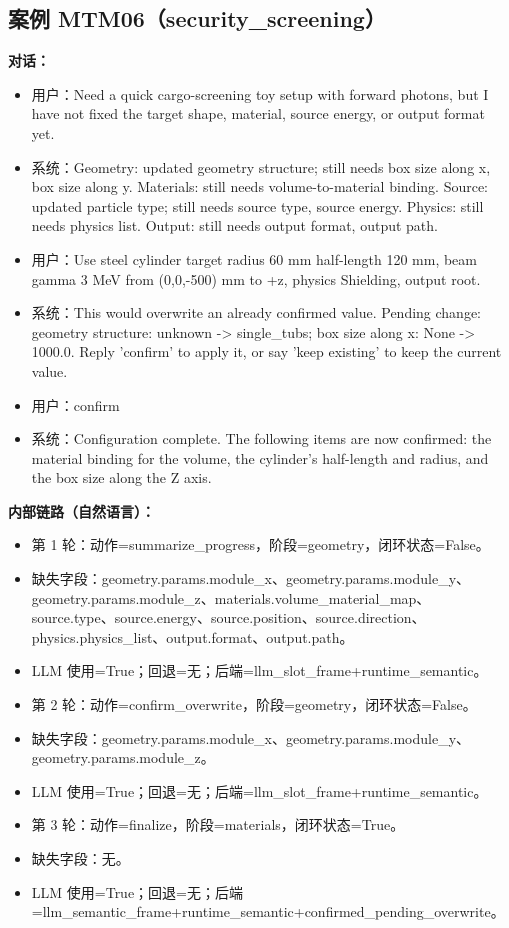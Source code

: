 \documentclass[11pt]{ctexart}
\begin{document}
\subsection{案例 MTM06（security\_screening）}
\textbf{对话：}
\begin{itemize}
\item 用户：Need a quick cargo-screening toy setup with forward photons, but I have not fixed the target shape, material, source energy, or output format yet.
\item 系统：Geometry: updated geometry structure; still needs box size along x, box size along y. Materials: still needs volume-to-material binding. Source: updated particle type; still needs source type, source energy. Physics: still needs physics list. Output: still needs output format, output path.
\item 用户：Use steel cylinder target radius 60 mm half-length 120 mm, beam gamma 3 MeV from (0,0,-500) mm to +z, physics Shielding, output root.
\item 系统：This would overwrite an already confirmed value. Pending change: geometry structure: unknown -> single\_tubs; box size along x: None -> 1000.0. Reply 'confirm' to apply it, or say 'keep existing' to keep the current value.
\item 用户：confirm
\item 系统：Configuration complete. The following items are now confirmed: the material binding for the volume, the cylinder's half-length and radius, and the box size along the Z axis.
\end{itemize}
\textbf{内部链路（自然语言）：}
\begin{itemize}
\item 第 1 轮：动作=summarize\_progress，阶段=geometry，闭环状态=False。
\item 缺失字段：geometry.params.module\_x、geometry.params.module\_y、geometry.params.module\_z、materials.volume\_material\_map、source.type、source.energy、source.position、source.direction、physics.physics\_list、output.format、output.path。
\item LLM 使用=True；回退=无；后端=llm\_slot\_frame+runtime\_semantic。
\item 第 2 轮：动作=confirm\_overwrite，阶段=geometry，闭环状态=False。
\item 缺失字段：geometry.params.module\_x、geometry.params.module\_y、geometry.params.module\_z。
\item LLM 使用=True；回退=无；后端=llm\_slot\_frame+runtime\_semantic。
\item 第 3 轮：动作=finalize，阶段=materials，闭环状态=True。
\item 缺失字段：无。
\item LLM 使用=True；回退=无；后端=llm\_semantic\_frame+runtime\_semantic+confirmed\_pending\_overwrite。
\end{itemize}
\end{document}
